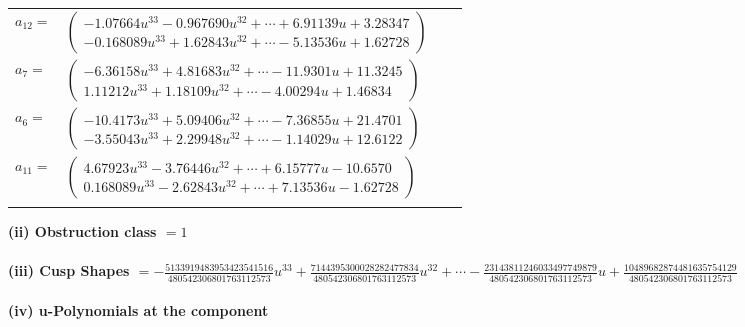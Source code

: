 \documentclass[1p]{elsarticle_modified}
\theoremstyle{definition}
\begin{document}
\begin{tabular}{m{7pt} m{180pt} m{7pt} m{180pt} }
\flushright $a_{12}=$&$\begin{pmatrix}-1.07664 u^{33}-0.967690 u^{32}+\cdots+6.91139 u+3.28347\\-0.168089 u^{33}+1.62843 u^{32}+\cdots-5.13536 u+1.62728\end{pmatrix}$ \\
\flushright $a_{7}=$&$\begin{pmatrix}-6.36158 u^{33}+4.81683 u^{32}+\cdots-11.9301 u+11.3245\\1.11212 u^{33}+1.18109 u^{32}+\cdots-4.00294 u+1.46834\end{pmatrix}$ \\
\flushright $a_{6}=$&$\begin{pmatrix}-10.4173 u^{33}+5.09406 u^{32}+\cdots-7.36855 u+21.4701\\-3.55043 u^{33}+2.29948 u^{32}+\cdots-1.14029 u+12.6122\end{pmatrix}$ \\
\flushright $a_{11}=$&$\begin{pmatrix}4.67923 u^{33}-3.76446 u^{32}+\cdots+6.15777 u-10.6570\\0.168089 u^{33}-2.62843 u^{32}+\cdots+7.13536 u-1.62728\end{pmatrix}$\\&\end{tabular}
\flushleft \textbf{(ii) Obstruction class $= 1$}\\~\\
\flushleft \textbf{(iii) Cusp Shapes $= -\frac{5133919483953423541516}{480542306801763112573} u^{33}+\frac{7144395300028282477834}{480542306801763112573} u^{32}+\cdots-\frac{23143811246033497749879}{480542306801763112573} u+\frac{10489682874481635754129}{480542306801763112573}$}\\~\\
\newpage\renewcommand{\arraystretch}{1}
\flushleft \textbf{(iv) u-Polynomials at the component}\newline \\
\end{document}
